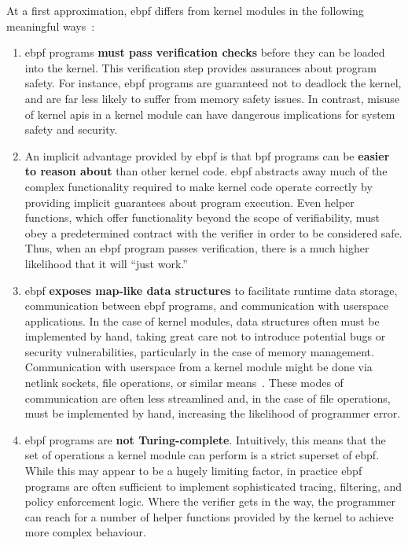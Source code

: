 At a first approximation, \gls{ebpf} differs from kernel modules in the following meaningful ways~\cite{gregg2019_bpf}:
\begin{enumerate}
  \item \gls{ebpf} programs \textbf{must pass verification checks} before they can be loaded into the
  kernel. This verification step provides assurances about program safety. For instance, \gls{ebpf}
  programs are guaranteed not to deadlock the kernel, and are far less likely to suffer from
  memory safety issues. In contrast, misuse of kernel \gls{api}s in a kernel module can have dangerous
  implications for system safety and security.

  \item An implicit advantage provided by \gls{ebpf} is that \gls{bpf} programs can be \textbf{easier
  to reason about} than other kernel code. \gls{ebpf} abstracts away much of the complex
  functionality required to make kernel code operate correctly by providing implicit
  guarantees about program execution. Even helper functions, which offer functionality
  beyond the scope of verifiability, must obey a predetermined contract with the verifier
  in order to be considered safe. Thus, when an \gls{ebpf} program passes verification, there is
  a much higher likelihood that it will \enquote{just work.}

  \item \gls{ebpf} \textbf{exposes map-like data structures} to facilitate runtime data storage,
  communication between \gls{ebpf} programs, and communication with userspace applications. In
  the case of kernel modules, data structures often must be implemented by hand, taking
  great care not to introduce potential bugs or security vulnerabilities, particularly in
  the case of memory management. Communication with userspace from a kernel module might
  be done via netlink sockets, file operations, or similar
  means~\cite{corbet1998_device_drivers}. These modes of communication are often less
  streamlined and, in the case of file operations, must be implemented by hand, increasing
  the likelihood of programmer error.

  \item \gls{ebpf} programs are \textbf{not Turing-complete}. Intuitively, this means that
  the set of operations a kernel module can perform is a strict superset of \gls{ebpf}. While
  this may appear to be a hugely limiting factor, in practice \gls{ebpf} programs are often
  sufficient to implement sophisticated tracing, filtering, and policy enforcement logic.
  Where the verifier gets in the way, the programmer can reach for a number of helper
  functions provided by the kernel to achieve more complex behaviour.


\end{enumerate}
